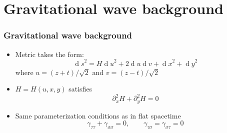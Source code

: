 \documentclass[11pt]{beamer}
\newcommand{\D}[1]{\ensuremath{\operatorname{d}\!{#1}}}
\newcommand{\difs}[3][]{\partial_{#3}^{#1}{#2}}
\begin{document}
\begin{frame}[plain]
	\vspace*{0.0cm}\hspace*{-0.85cm}
\end{frame}


\section{Gravitational wave background}



\begin{frame}
\frametitle{Gravitational wave background}
\begin{itemize}
	\item Metric takes the form:
	$$
	\D s^2 = H \D u^2 + 2 \D u \D v + \D x^2 + \D y^2
	$$
	where $u = (z+t)/\sqrt{2}$ and $v = (z-t)/\sqrt{2}$
	\item $H = H(u, x, y)$ satisfies
	$$
	\difs[2] H x + \difs[2] H y = 0
	$$
	\pause
	\item Same parameterization conditions as in flat spacetime
	$$
	\gamma_{\tau \tau} + \gamma_{\sigma \sigma} = 0, \qquad \gamma_{\tau \sigma} = \gamma_{\sigma \tau} = 0
	$$
\end{itemize}
\end{frame}
\end{document}
